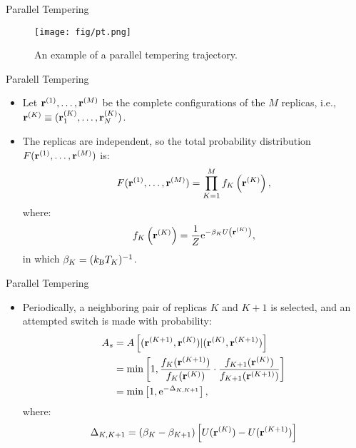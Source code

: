 \documentclass[10pt]{beamer}
\begin{document}
\begin{frame}{Parallel Tempering}
\begin{figure}
  \texttt{[image: fig/pt.png]}
  \caption{An example of a parallel tempering trajectory.}
\end{figure}
\end{frame}

\begin{frame}{Paralell Tempering}
\begin{itemize}
\setlength\itemsep{1em}
  \item Let ${\bf r}^{(1)}, \dots, {\bf r}^{(M)}$ be the complete configurations of the $M$ replicas, i.e., ${\bf r}^{(K)} \equiv ({\bf r}_1^{(K)}, \dots, {\bf r}_N^{(K)})$.

  \item The replicas are independent, so the total probability distribution $F({\bf r}^{(1)}, \dots, {\bf r}^{(M)})$ is:
  \begin{equation}
    F({\bf r}^{(1)}, \dots, {\bf r}^{(M)}) = \prod_{K=1}^{M} f_K\left( {\bf r}^{(K)} \right),
  \end{equation}
  where:
  \begin{equation}
    f_K\left( {\bf r}^{(K)} \right) = \frac{1}{Z} \mathrm{e}^{-\beta_K U\left( {\bf r}^{(K)} \right)},
  \end{equation}
  in which $\beta_K = (k_\mathrm{B}T_K)^{-1}$.
\end{itemize}
\end{frame}

\begin{frame}{Parallel Tempering}
\begin{itemize}
\setlength\itemsep{1em}
  \item Periodically, a neighboring pair of replicas $K$ and $K+1$ is selected, and an attempted switch is made with probability:
  \begin{align}
    A_s &= A\left[ ({\bf r}^{(K+1)}, {\bf r}^{(K)}) | ({\bf r}^{(K)}, {\bf r}^{(K+1)}) \right] \\
        &= \min\left[ 1, \frac{f_K({\bf r}^{(K+1)})}{f_K({\bf r}^{(K)})} \cdot \frac{f_{K+1}({\bf r}^{(K)})}{f_{K+1}({\bf r}^{(K+1)})} \right] \\
    &= \min\left[ 1, \mathrm{e}^{-\Delta_{K,K+1}} \right],
  \end{align}
  where:
  \begin{equation}
    \Delta_{K,K+1} = (\beta_K - \beta_{K+1}) \left[ U({\bf r}^{(K)}) - U({\bf r}^{(K+1)}) \right]
  \end{equation}
\end{itemize}
\end{frame}
\end{document}
